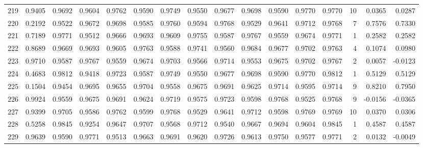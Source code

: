 \begin{tabular}{lrrrrrrrrrrrrrrr}
219 &      0.9405 &  0.9692 &  0.9604 &  0.9762 &  0.9590 &  0.9749 &  0.9550 &  0.9677 &  0.9698 &  0.9590 &   0.9770 &     0.9770 &     10 &                    0.0365 &                     0.0287 \\
220 &      0.2192 &  0.9522 &  0.9672 &  0.9698 &  0.9585 &  0.9760 &  0.9594 &  0.9768 &  0.9529 &  0.9641 &   0.9712 &     0.9768 &      7 &                    0.7576 &                     0.7330 \\
221 &      0.7189 &  0.9771 &  0.9512 &  0.9666 &  0.9693 &  0.9609 &  0.9755 &  0.9587 &  0.9767 &  0.9559 &   0.9674 &     0.9771 &      1 &                    0.2582 &                     0.2582 \\
222 &      0.8689 &  0.9669 &  0.9693 &  0.9605 &  0.9763 &  0.9588 &  0.9741 &  0.9560 &  0.9684 &  0.9677 &   0.9702 &     0.9763 &      4 &                    0.1074 &                     0.0980 \\
223 &      0.9710 &  0.9587 &  0.9767 &  0.9559 &  0.9674 &  0.9703 &  0.9566 &  0.9714 &  0.9553 &  0.9675 &   0.9702 &     0.9767 &      2 &                    0.0057 &                    -0.0123 \\
224 &      0.4683 &  0.9812 &  0.9418 &  0.9723 &  0.9587 &  0.9749 &  0.9550 &  0.9677 &  0.9698 &  0.9590 &   0.9770 &     0.9812 &      1 &                    0.5129 &                     0.5129 \\
225 &      0.1504 &  0.9454 &  0.9695 &  0.9655 &  0.9704 &  0.9558 &  0.9675 &  0.9691 &  0.9625 &  0.9714 &   0.9595 &     0.9714 &      9 &                    0.8210 &                     0.7950 \\
226 &      0.9924 &  0.9559 &  0.9675 &  0.9691 &  0.9624 &  0.9719 &  0.9575 &  0.9723 &  0.9598 &  0.9768 &   0.9525 &     0.9768 &      9 &                   -0.0156 &                    -0.0365 \\
227 &      0.9399 &  0.9705 &  0.9586 &  0.9762 &  0.9599 &  0.9768 &  0.9529 &  0.9641 &  0.9712 &  0.9598 &   0.9769 &     0.9769 &     10 &                    0.0370 &                     0.0306 \\
228 &      0.5258 &  0.9845 &  0.9254 &  0.9647 &  0.9707 &  0.9568 &  0.9712 &  0.9540 &  0.9667 &  0.9694 &   0.9604 &     0.9845 &      1 &                    0.4587 &                     0.4587 \\
229 &      0.9639 &  0.9590 &  0.9771 &  0.9513 &  0.9663 &  0.9691 &  0.9620 &  0.9726 &  0.9613 &  0.9750 &   0.9577 &     0.9771 &      2 &                    0.0132 &                    -0.0049 \\

\end{tabular}
